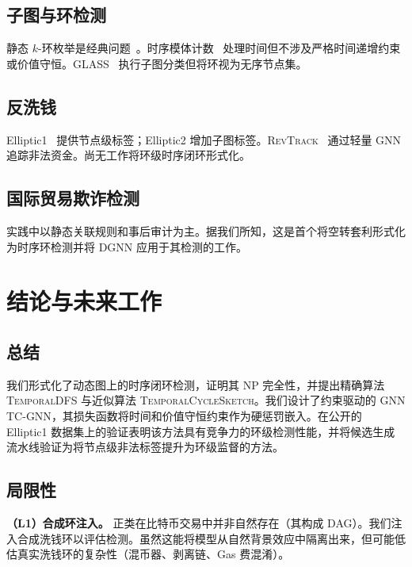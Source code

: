 \documentclass[journal,onecolumn]{IEEEtran}
\begin{document}
\subsection{子图与环检测}
\label{sec:related-cycle}

静态 $k$-环枚举是经典问题~\cite{ayz1995}。时序模体计数~\cite{fastMotif2017} 处理时间但不涉及严格时间递增约束或价值守恒。GLASS~\cite{glass2021} 执行子图分类但将环视为无序节点集。

\subsection{反洗钱}
\label{sec:related-aml}

Elliptic1~\cite{ellipticData2019} 提供节点级标签；Elliptic2 增加子图标签。\textsc{RevTrack}~\cite{revtrack2023} 通过轻量 GNN 追踪非法资金。尚无工作将环级时序闭环形式化。

\subsection{国际贸易欺诈检测}
\label{sec:related-trade}

实践中以静态关联规则和事后审计为主。据我们所知，这是首个将空转套利形式化为时序环检测并将 DGNN 应用于其检测的工作。

\section{结论与未来工作}
\label{sec:conclusion}

\subsection{总结}
\label{sec:conclusion-summary}

我们形式化了动态图上的时序闭环检测，证明其 NP 完全性，并提出精确算法 \textsc{TemporalDFS} 与近似算法 \textsc{TemporalCycleSketch}。我们设计了约束驱动的 GNN \textsc{TC-GNN}，其损失函数将时间和价值守恒约束作为硬惩罚嵌入。在公开的 Elliptic1 数据集上的验证表明该方法具有竞争力的环级检测性能，并将候选生成流水线验证为将节点级非法标签提升为环级监督的方法。

\subsection{局限性}
\label{sec:conclusion-limit}

\textbf{（L1）合成环注入。} 正类在比特币交易中并非自然存在（其构成 DAG）。我们注入合成洗钱环以评估检测。虽然这能将模型从自然背景效应中隔离出来，但可能低估真实洗钱环的复杂性（混币器、剥离链、Gas 费混淆）。
\end{document}
